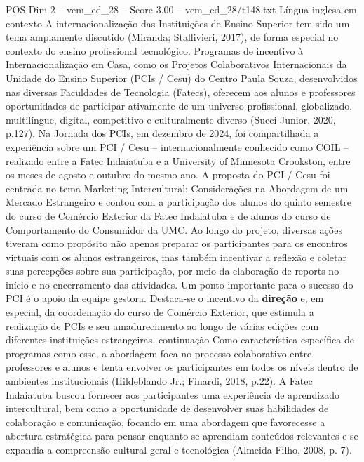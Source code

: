 \begin{textsample}{POS Dim 2 – vem\_ed\_28 – Score 3.00 – vem\_ed\_28/t148.txt}  \label{ex:f2_pos_080}
Língua inglesa em contexto A internacionalização das Instituições de Ensino Superior tem sido um tema amplamente discutido (Miranda; Stallivieri, 2017), de forma especial no contexto do ensino profissional tecnológico.
Programas de incentivo à Internacionalização em Casa, como os Projetos Colaborativos Internacionais da Unidade do Ensino Superior (PCIs / Cesu) do Centro Paula Souza, desenvolvidos nas diversas Faculdades de Tecnologia (Fatecs), oferecem aos alunos e professores oportunidades de participar ativamente de um universo profissional, globalizado, multilíngue, digital, competitivo e culturalmente diverso (Succi Junior, 2020, p.127).
Na Jornada dos PCIs, em dezembro de 2024, foi compartilhada a experiência sobre um PCI / Cesu – internacionalmente conhecido como COIL – realizado entre a Fatec Indaiatuba e a University of Minnesota Crookston, entre os meses de agosto e outubro do mesmo ano.
A proposta do PCI / Cesu foi centrada no tema Marketing Intercultural: Considerações na Abordagem de um Mercado Estrangeiro e contou com a participação dos alunos do quinto semestre do curso de Comércio Exterior da Fatec Indaiatuba e de alunos do curso de Comportamento do Consumidor da UMC.
Ao longo do projeto, diversas ações tiveram como propósito não apenas preparar os participantes para os encontros virtuais com os alunos estrangeiros, mas também incentivar a reflexão e coletar suas percepções sobre sua participação, por meio da elaboração de reports no início e no encerramento das atividades.
Um ponto importante para o sucesso do PCI é o apoio da equipe gestora.
Destaca-se o incentivo da \textbf{direção} e, em especial, da coordenação do curso de Comércio Exterior, que estimula a realização de PCIs e seu amadurecimento ao longo de várias edições com diferentes instituições estrangeiras. continuação Como característica específica de programas como esse, a abordagem foca no processo colaborativo entre professores e alunos e tenta envolver os participantes em todos os níveis dentro de ambientes institucionais (Hildeblando Jr.; Finardi, 2018, p.22).
A Fatec Indaiatuba buscou fornecer aos participantes uma experiência de aprendizado intercultural, bem como a oportunidade de desenvolver suas habilidades de colaboração e comunicação, focando em uma abordagem que favorecesse a abertura estratégica para pensar enquanto se aprendiam conteúdos relevantes e se expandia a compreensão cultural geral e tecnológica (Almeida Filho, 2008, p. 7).

\end{textsample}
